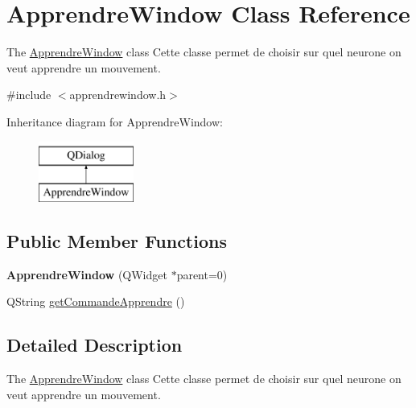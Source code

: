 \hypertarget{classApprendreWindow}{\section{Apprendre\-Window Class Reference}
\label{classApprendreWindow}
}


The \hyperlink{classApprendreWindow}{Apprendre\-Window} class Cette classe permet de choisir sur quel neurone on veut apprendre un mouvement.  




{\ttfamily \#include $<$apprendrewindow.\-h$>$}

Inheritance diagram for Apprendre\-Window\-:\begin{figure}[H]
\begin{center}
\leavevmode
\includegraphics[height=2.000000cm]{classApprendreWindow}
\end{center}
\end{figure}
\subsection*{Public Member Functions}
\begin{DoxyCompactItemize}
\item 
\hypertarget{classApprendreWindow_a8ec93e286a2cb7363848a93d6cd74c9a}{{\bfseries Apprendre\-Window} (Q\-Widget $\ast$parent=0)}\label{classApprendreWindow_a8ec93e286a2cb7363848a93d6cd74c9a}

\item 
Q\-String \hyperlink{classApprendreWindow_a3e8a7b4d49fde43ac715db5b48302355}{get\-Commande\-Apprendre} ()
\end{DoxyCompactItemize}


\subsection{Detailed Description}
The \hyperlink{classApprendreWindow}{Apprendre\-Window} class Cette classe permet de choisir sur quel neurone on veut apprendre un mouvement. 

